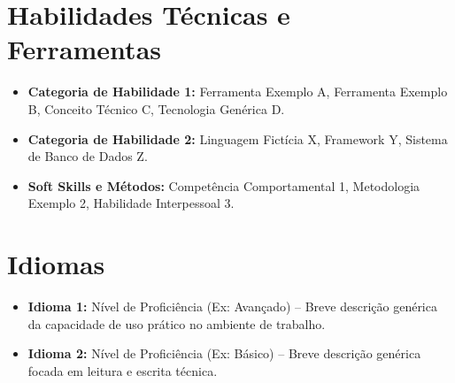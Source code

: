 \documentclass[11pt,a4paper]{article}
\begin{document}
\section*{Habilidades T\'ecnicas e Ferramentas}
\vspace{6pt}
\begin{itemize}[leftmargin=*, noitemsep, topsep=0pt]
    \item \textbf{Categoria de Habilidade 1:} Ferramenta Exemplo A, Ferramenta Exemplo B, Conceito T\'ecnico C, Tecnologia Gen\'erica D.
    \item \textbf{Categoria de Habilidade 2:} Linguagem Fict\'icia X, Framework Y, Sistema de Banco de Dados Z.
    \item \textbf{Soft Skills e M\'etodos:} Compet\^encia Comportamental 1, Metodologia Exemplo 2, Habilidade Interpessoal 3.
\end{itemize}

\section*{Idiomas}
\vspace{6pt}
\begin{itemize}[leftmargin=*, noitemsep, topsep=0pt]
    \item \textbf{Idioma 1:} N\'ivel de Profici\^encia (Ex: Avan\c{c}ado) -- Breve descri\c{c}\~ao gen\'erica da capacidade de uso pr\'atico no ambiente de trabalho.
    \item \textbf{Idioma 2:} N\'ivel de Profici\^encia (Ex: B\'asico) -- Breve descri\c{c}\~ao gen\'erica focada em leitura e escrita t\'ecnica.
\end{itemize}
\end{document}
